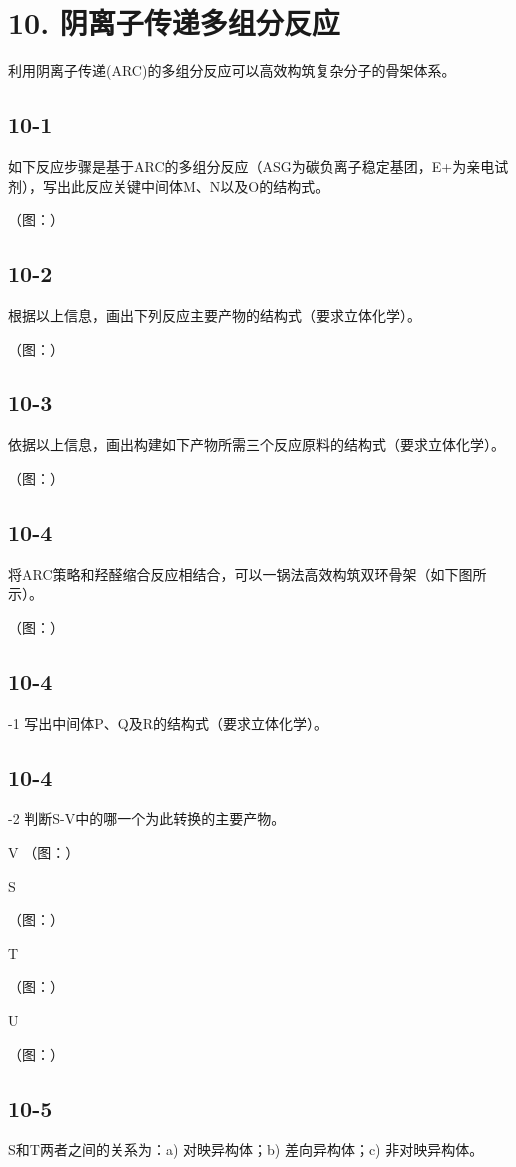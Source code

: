 \section*{10. 阴离子传递多组分反应}
利⽤阴离⼦传递(ARC)的多组分反应可以⾼效构筑复杂分⼦的⻣架体系。

\subsection*{10-1}
如下反应步骤是基于ARC的多组分反应（ASG为碳负离⼦稳定基团，E+为亲电试剂），写出此反应关键中间体M、N以及O的结构式。

（图：）

\subsection*{10-2}
根据以上信息，画出下列反应主要产物的结构式（要求⽴体化学）。

（图：）

\subsection*{10-3}
依据以上信息，画出构建如下产物所需三个反应原料的结构式（要求⽴体化学）。

（图：）

\subsection*{10-4}
将ARC策略和羟醛缩合反应相结合，可以⼀锅法⾼效构筑双环⻣架（如下图所⽰）。

（图：）

\subsection*{10-4}
-1 写出中间体P、Q及R的结构式（要求⽴体化学）。

\subsection*{10-4}
-2 判断S-V中的哪⼀个为此转换的主要产物。

V
（图：）

S

（图：）

T

（图：）

U

（图：）

\subsection*{10-5}
S和T两者之间的关系为：a) 对映异构体；b) 差向异构体；c) ⾮对映异构体。
